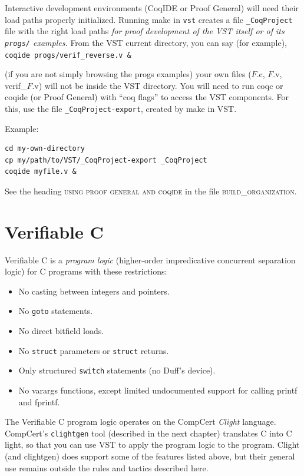\documentclass[12pt,fleqn,openany,oneside,showtrims]{memoir}
\begin{document}
\label{loadpaths}
Interactive development environments (CoqIDE or Proof General)
will need their load paths properly initialized.
Running \textsf{make} in
\lstinline{vst} creates a file \lstinline{_CoqProject} file with
the right load paths \emph{for proof development of the VST itself
or of its \lstinline{progs/} examples.}
From the VST current directory, you can say (for example),
\newline
\lstinline{coqide progs/verif_reverse.v &}

(if you are not simply browsing the \textsf{progs} examples)
your own files ($F$.c, $F$.v, verif\_$F$.v) will not be inside
the VST directory.  You will need to run coqc or coqide (or Proof General)
with ``coq flags'' to access the VST components.  For this, use
the file \lstinline{_CoqProject-export},
created by \textsf{make} in VST.

Example:
\begin{lstlisting}
cd my-own-directory
cp my/path/to/VST/_CoqProject-export _CoqProject
coqide myfile.v &
\end{lstlisting}


See the heading
\textsc{using proof general and coqide}
in the file \textsc{build\_organization}.

\chapter{Verifiable C}
\label{refcard:verifiable-c}
Verifiable C is a \emph{program logic} (higher-order impredicative concurrent separation logic) for C programs with these restrictions:
\begin{itemize}
  \item No casting between integers and pointers.
  \item No \lstinline{goto} statements.
  \item No direct bitfield loads.
  \item No \lstinline{struct} parameters or \lstinline{struct} returns.
  \item Only structured \lstinline{switch} statements (no Duff's device).
  \item No varargs functions, except limited undocumented support for calling printf and fprintf.
\end{itemize}

The Verifiable C program logic operates on the CompCert \emph{Clight}
language.  CompCert's \lstinline{clightgen} tool (described in the
next chapter) translates C into C light, so that you can use VST
to apply the program logic to the program.  Clight (and clightgen) does support
some of the features listed above, but their general use remains outside
the rules and tactics described here.
\end{document}
